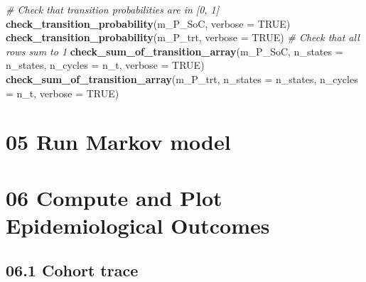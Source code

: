 \documentclass[
]{article}
\newenvironment{Shaded}{\begin{snugshade}}{\end{snugshade}}
\newcommand{\CommentTok}[1]{\textcolor[rgb]{0.56,0.35,0.01}{\textit{#1}}}
\newcommand{\ControlFlowTok}[1]{\textcolor[rgb]{0.13,0.29,0.53}{\textbf{#1}}}
\newcommand{\DataTypeTok}[1]{\textcolor[rgb]{0.13,0.29,0.53}{#1}}
\newcommand{\DecValTok}[1]{\textcolor[rgb]{0.00,0.00,0.81}{#1}}
\newcommand{\KeywordTok}[1]{\textcolor[rgb]{0.13,0.29,0.53}{\textbf{#1}}}
\newcommand{\NormalTok}[1]{#1}
\newcommand{\OperatorTok}[1]{\textcolor[rgb]{0.81,0.36,0.00}{\textbf{#1}}}
\newcommand{\OtherTok}[1]{\textcolor[rgb]{0.56,0.35,0.01}{#1}}
\newcommand{\StringTok}[1]{\textcolor[rgb]{0.31,0.60,0.02}{#1}}
\begin{document}
\begin{Shaded}
\begin{Highlighting}[]
\CommentTok{# Check that transition probabilities are in [0, 1]}
\KeywordTok{check_transition_probability}\NormalTok{(m_P_SoC, }\DataTypeTok{verbose =} \OtherTok{TRUE}\NormalTok{)}
\KeywordTok{check_transition_probability}\NormalTok{(m_P_trt, }\DataTypeTok{verbose =} \OtherTok{TRUE}\NormalTok{)}
\CommentTok{# Check that all rows sum to 1}
\KeywordTok{check_sum_of_transition_array}\NormalTok{(m_P_SoC, }\DataTypeTok{n_states =}\NormalTok{ n_states, }\DataTypeTok{n_cycles =}\NormalTok{ n_t, }\DataTypeTok{verbose =} \OtherTok{TRUE}\NormalTok{)}
\KeywordTok{check_sum_of_transition_array}\NormalTok{(m_P_trt, }\DataTypeTok{n_states =}\NormalTok{ n_states, }\DataTypeTok{n_cycles =}\NormalTok{ n_t, }\DataTypeTok{verbose =} \OtherTok{TRUE}\NormalTok{)}
\end{Highlighting}
\end{Shaded}

\hypertarget{run-markov-model}{%
\section{05 Run Markov model}\label{run-markov-model}}

\begin{Shaded}
\end{Shaded}

\hypertarget{compute-and-plot-epidemiological-outcomes}{%
\section{06 Compute and Plot Epidemiological
Outcomes}\label{compute-and-plot-epidemiological-outcomes}}

\hypertarget{cohort-trace-1}{%
\subsection{06.1 Cohort trace}\label{cohort-trace-1}}
\end{document}
